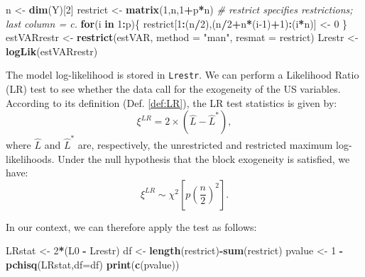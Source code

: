\documentclass[
  12pt,
]{book}
\newenvironment{Shaded}{\begin{snugshade}}{\end{snugshade}}
\newcommand{\AttributeTok}[1]{\textcolor[rgb]{0.13,0.29,0.53}{#1}}
\newcommand{\CommentTok}[1]{\textcolor[rgb]{0.56,0.35,0.01}{\textit{#1}}}
\newcommand{\ControlFlowTok}[1]{\textcolor[rgb]{0.13,0.29,0.53}{\textbf{#1}}}
\newcommand{\DecValTok}[1]{\textcolor[rgb]{0.00,0.00,0.81}{#1}}
\newcommand{\FunctionTok}[1]{\textcolor[rgb]{0.13,0.29,0.53}{\textbf{#1}}}
\newcommand{\NormalTok}[1]{#1}
\newcommand{\OtherTok}[1]{\textcolor[rgb]{0.56,0.35,0.01}{#1}}
\newcommand{\SpecialCharTok}[1]{\textcolor[rgb]{0.81,0.36,0.00}{\textbf{#1}}}
\newcommand{\StringTok}[1]{\textcolor[rgb]{0.31,0.60,0.02}{#1}}
\theoremstyle{definition}
\theoremstyle{definition}
\theoremstyle{definition}
\theoremstyle{definition}
\theoremstyle{remark}
\begin{document}
\begin{Shaded}
\begin{Highlighting}[]
\NormalTok{n }\OtherTok{\textless{}{-}} \FunctionTok{dim}\NormalTok{(Y)[}\DecValTok{2}\NormalTok{]}
\NormalTok{restrict }\OtherTok{\textless{}{-}} \FunctionTok{matrix}\NormalTok{(}\DecValTok{1}\NormalTok{,n,}\DecValTok{1}\SpecialCharTok{+}\NormalTok{p}\SpecialCharTok{*}\NormalTok{n) }\CommentTok{\# \textquotesingle{}restrict\textquotesingle{} specifies restrictions; last column = \textquotesingle{}c\textquotesingle{}.}
\ControlFlowTok{for}\NormalTok{(i }\ControlFlowTok{in} \DecValTok{1}\SpecialCharTok{:}\NormalTok{p)\{}
\NormalTok{  restrict[}\DecValTok{1}\SpecialCharTok{:}\NormalTok{(n}\SpecialCharTok{/}\DecValTok{2}\NormalTok{),(n}\SpecialCharTok{/}\DecValTok{2}\SpecialCharTok{+}\NormalTok{n}\SpecialCharTok{*}\NormalTok{(i}\DecValTok{{-}1}\NormalTok{)}\SpecialCharTok{+}\DecValTok{1}\NormalTok{)}\SpecialCharTok{:}\NormalTok{(i}\SpecialCharTok{*}\NormalTok{n)] }\OtherTok{\textless{}{-}} \DecValTok{0}
\NormalTok{\}}
\NormalTok{estVARrestr }\OtherTok{\textless{}{-}} \FunctionTok{restrict}\NormalTok{(estVAR, }\AttributeTok{method =} \StringTok{"man"}\NormalTok{, }\AttributeTok{resmat =}\NormalTok{ restrict)}
\NormalTok{Lrestr }\OtherTok{\textless{}{-}} \FunctionTok{logLik}\NormalTok{(estVARrestr)}
\end{Highlighting}
\end{Shaded}

The model log-likelihood is stored in \texttt{Lrestr}. We can perform a Likelihood Ratio (LR) test to see whether the data call for the exogeneity of the US variables. According to its definition (Def. \ref{def:LR}), the LR test statistics is given by:
\[
\xi^{LR} =2 \times (\hat{L} - \hat{L}^*), 
\]
where \(\hat{L}\) and \(\hat{L}^*\) are, respectively, the unrestricted and restricted maximum log-likelihoods. Under the null hypothesis that the block exogeneity is satisfied, we have:
\[
\xi^{LR} \sim \chi^2\left[p\left(\frac{n}{2}\right)^2\right].
\]

In our context, we can therefore apply the test as follows:

\begin{Shaded}
\begin{Highlighting}[]
\NormalTok{LRstat }\OtherTok{\textless{}{-}} \DecValTok{2}\SpecialCharTok{*}\NormalTok{(L0 }\SpecialCharTok{{-}}\NormalTok{ Lrestr)}
\NormalTok{df }\OtherTok{\textless{}{-}} \FunctionTok{length}\NormalTok{(restrict)}\SpecialCharTok{{-}}\FunctionTok{sum}\NormalTok{(restrict)}
\NormalTok{pvalue }\OtherTok{\textless{}{-}} \DecValTok{1} \SpecialCharTok{{-}} \FunctionTok{pchisq}\NormalTok{(LRstat,}\AttributeTok{df=}\NormalTok{df)}
\FunctionTok{print}\NormalTok{(}\FunctionTok{c}\NormalTok{(pvalue))}
\end{Highlighting}
\end{Shaded}
\end{document}
